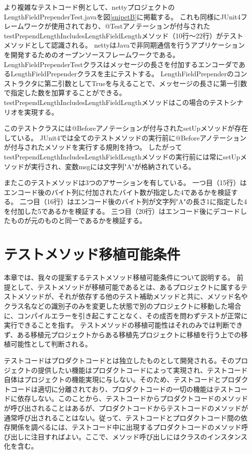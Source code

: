\documentclass[conference]{IEEEtran}
\begin{document}
より複雑なテストコード例として、nettyプロジェクトのLengthFieldPrependerTest.javaを図\ref{snipetB}に掲載する。
これも同様にJUnit4フレームワークが使用されており、@Testアノテーションが付与されたtestPrependLengthIncludesLengthFieldLengthメソッド（10行〜22行）がテストメソッドとして認識される。
nettyはJavaで非同期通信を行うアプリケーションを開発するためのオープンソースフレームワークである。
LengthFieldPrependerTestクラスはメッセージの長さを付加するエンコーダであるLengthFieldPrependerクラスを主にテストする。
LengthFieldPrependerのコンストラクタに第二引数としてTrueを与えることで、メッセージの長さに第一引数で指定した数を加算することができる。
testPrependLengthIncludesLengthFieldLengthメソッドはこの場合のテストシナリオを実現する。

このテストクラスには@Beforeアノテーションが付与されたsetUpメソッドが存在している。
JUnit4では全てのテストメソッドの実行前に@Beforeアノテーションが付与されたメソッドを実行する規則を持つ。
したがってtestPrependLengthIncludesLengthFieldLengthメソッドの実行前には常にsetUpメソッドが実行され、変数msgには文字列"A"が格納されている。

またこのテストメソッドは3つのアサーションを有している。
一つ目（15行）はエンコード後のバイト列に付加されたバイト数が指定した4であるかを検証する。
二つ目（16行）はエンコード後のバイト列が文字列"A"の長さ1に指定した4を付加した5であるかを検証する。
三つ目（20行）はエンコード後にデコードしたものが元のものと同一であるかを検証する。



\section{テストメソッド移植可能条件}

本章では、我々の提案するテストメソッド移植可能条件について説明する。
前提として、テストメソッドが移植可能であるとは、あるプロジェクトに属するテストメソッドが、それが依存する他のテスト補助メソッドと共に、メソッド名やクラス名などの識別子のみを変更した状態で別のプロジェクトに移動した場合に、コンパイルエラーを引き起こすことなく、その成否を問わずテストが正常に実行できることを指す。
テストメソッドの移植可能性はそれのみでは判断できず、ある移植元プロジェクトからある移植先プロジェクトに移植を行う上での移植可能性として判断される。

テストコードはプロダクトコードとは独立したものとして開発される。そのプロジェクトの提供したい機能はプロダクトコードによって実現され、テストコード自体はプロジェクトの機能実現に与しない。そのため、テストコードとプロダクトコードは適切に分離されており、プロダクトコードの一切の機能はテストコードに依存しない。このことから、テストコードからプロダクトコードのメソッドが呼び出されることはあるが、プロダクトコードからテストコードのメソッドが通常呼び出されることはない。従って、テストコードとプロダクトコード間の依存関係を調べるには、テストコード中に出現するプロダクトコードのメソッド呼び出しに注目すればよい。ここで、メソッド呼び出しにはクラスのインスタンス化を含む。
\end{document}
